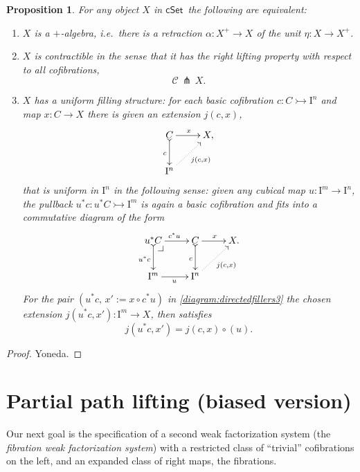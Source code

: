 \documentclass[11pt]{article}
\makeatletter
\newcommand{\cSet}{\ensuremath{\mathsf{cSet}}}
\newcommand{\pbcorner}[1][dr]{\save*!/#1-1.2pc/#1:(-1,1)@^{|-}\restore}
\newcommand{\mono}{\ensuremath{\rightarrowtail}}
\newcommand{\I}{\ensuremath{\mathrm{I}}}
\newtheorem{proposition}[theorem]{Proposition}
\theoremstyle{remark}
\theoremstyle{definition}
\makeatother
\begin{document}
\begin{proposition}\label{prop:uniformstructequiv} For any object $X$ in \cSet\ the following are equivalent:
\begin{enumerate}
\item $X$ is a \emph{$+$-algebra}, i.e.\ there is a retraction $\alpha :X^+ \to X$ of the unit $\eta : X\to X^+$.
\item $X$ is  \emph{contractible} in the sense that it has the right lifting property with respect to all cofibrations,
\[
\mathcal{C}\, \pitchfork\,X.
\]
\item $X$ has a \emph{uniform filling structure}: 
for each basic cofibration $c : C \mono \I^{n}$ and map $x : C\to X$ there is given an extension $j(c,x)$,
\begin{equation}\label{diagram:directedfillers}
\xymatrix{
C \ar@{>->}[d]_{c} \ar[r]^{x} & X, \\
\I^{n}\ar@{.>}[ru]_{j(c,x)} &
}
\end{equation}
that is \emph{uniform in $\I^n$} in the following sense: given any cubical map $u : \I^m \to \I^n$, the pullback $u^*c : u^*C\mono \I^m$ is again a basic cofibration and fits into a commutative diagram of the form
\begin{equation}\label{diagram:directedfillers3}
\xymatrix{
u^*C \ar@{>->}[d]_{u^*c} \ar[r]^{c^*u} \pbcorner &  C \ar@{>->}[d]_{c} \ar[r]^{x} & X. \\
\I^{m} \ar[r]_{u} & \I^{n} \ar@{.>}[ru]_{j(c,x)} &
}
\end{equation}
For the pair $(u^*c,\, x' := x\circ c^*u)$ in \eqref{diagram:directedfillers3} the chosen extension $j(u^*c,x'): \I^m \to X$, then satisfies
\begin{equation}\label{eq:uniformfillers}
j(u^*c,x') = j(c,x)\circ (u).
\end{equation}
\end{enumerate}
\end{proposition}

\begin{proof}
Yoneda.
\end{proof}

\section{Partial path lifting (biased version)}

Our next goal is the specification of a second weak factorization system (the \emph{fibration weak factorization system}) with a restricted class of ``trivial'' cofibrations on the left, and an expanded class of right maps, the fibrations. 
\end{document}
